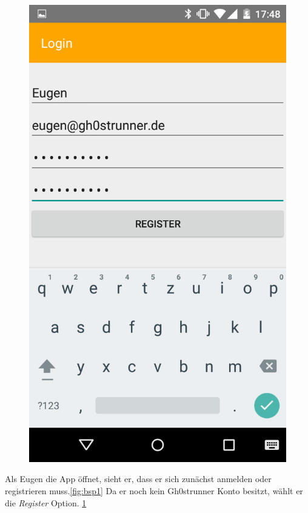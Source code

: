\begin{figure}
\begin{minipage}{.4\textwidth}
  \includegraphics[width=.8\linewidth]{abb/bsp/bsp2}
  \label{fig:bsp2}
\end{minipage}
\end{figure}

Als Eugen die App öffnet, sieht er, dass er sich zunächst anmelden oder registrieren muss.\ref{fig:bsp1} Da er noch kein Gh0strunner Konto besitzt, wählt er die \textit{Register} Option. \ref{fig:bsp2}

